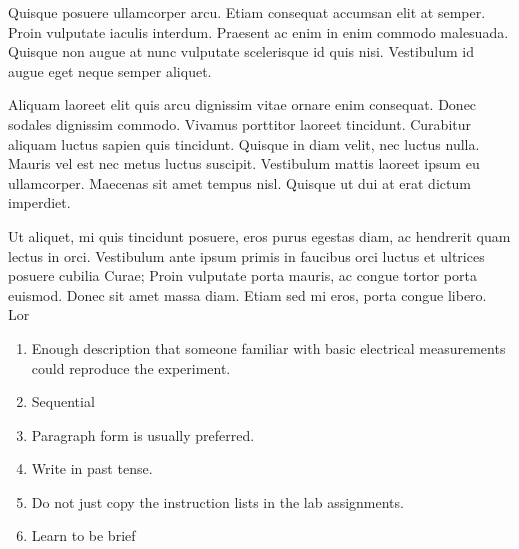 \documentclass{article}
\begin{document}
Quisque posuere ullamcorper arcu. Etiam consequat accumsan elit at
semper. Proin vulputate iaculis interdum. Praesent ac enim in enim commodo
malesuada. Quisque non augue at nunc vulputate scelerisque id quis nisi.
Vestibulum id augue eget neque semper aliquet.

Aliquam laoreet elit quis arcu dignissim vitae ornare enim consequat. Donec
sodales dignissim commodo. Vivamus porttitor laoreet tincidunt. Curabitur
aliquam luctus sapien quis tincidunt. Quisque in diam velit, nec luctus nulla.
Mauris vel est nec metus luctus suscipit. Vestibulum mattis laoreet ipsum eu
ullamcorper. Maecenas sit amet tempus nisl. Quisque ut dui at erat dictum
imperdiet. 

Ut aliquet, mi quis tincidunt posuere, eros purus egestas diam, ac
hendrerit quam lectus in orci. Vestibulum ante ipsum primis in faucibus orci
luctus et ultrices posuere cubilia Curae; Proin vulputate porta mauris, ac
congue tortor porta euismod. Donec sit amet massa diam. Etiam sed mi eros,
porta congue libero. Lor

\begin{enumerate}{}{}
  \item Enough description that someone familiar with basic electrical
    measurements could reproduce the experiment.
  \item Sequential
  \item Paragraph form is usually preferred.
  \item Write in past tense.
  \item Do not just copy the instruction lists in the lab assignments.
  \item Learn to be brief
\end{enumerate}
\end{document}
